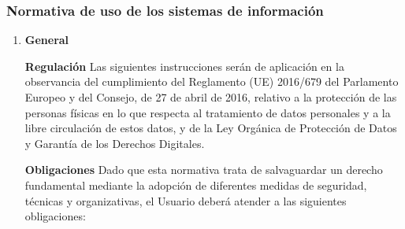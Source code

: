 
\subsubsection{Normativa de uso de los sistemas de información}

\begin{enumerate}[label=\alph*)]

    \item \textbf{General}

    \textbf{Regulación} Las siguientes instrucciones serán de aplicación en la observancia del cumplimiento del Reglamento (UE) 2016/679 del Parlamento Europeo y del Consejo, de 27 de abril de 2016, relativo a la protección de las personas físicas en lo que respecta al tratamiento de datos personales y a la libre circulación de estos datos, y de la Ley Orgánica de Protección de Datos y Garantía de los Derechos Digitales.

    \textbf{Obligaciones} Dado que esta normativa trata de salvaguardar un derecho fundamental mediante la adopción de diferentes medidas de seguridad, técnicas y organizativas, el Usuario deberá atender a las siguientes obligaciones:


\end{enumerate}
